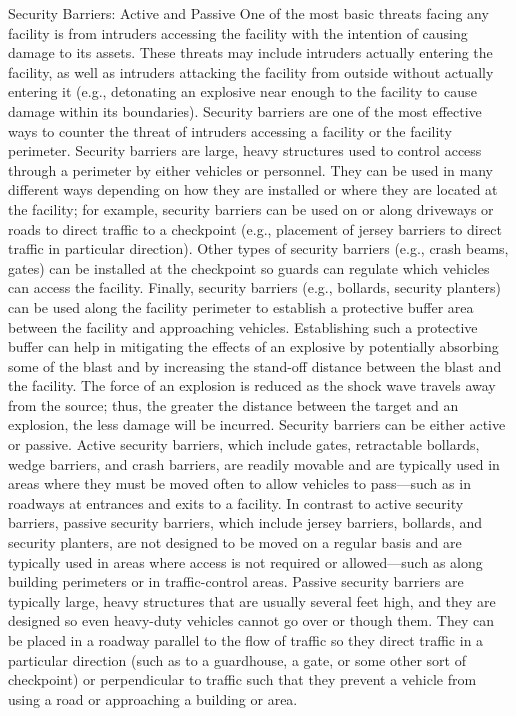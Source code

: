\documentclass{article}
\begin{document}
Security Barriers: Active and Passive One of the most basic threats
facing any facility is from intruders accessing the facility with the
intention of causing damage to its assets. These threats may include
intruders actually entering the facility, as well as intruders attacking
the facility from outside without actually entering it (e.g., detonating
an explosive near enough to the facility to cause damage within its
boundaries). Security barriers are one of the most effective ways to
counter the threat of intruders accessing a facility or the facility
perimeter. Security barriers are large, heavy structures used to control
access through a perimeter by either vehicles or personnel. They can be
used in many different ways depending on how they are installed or where
they are located at the facility; for example, security barriers can be
used on or along driveways or roads to direct traffic to a checkpoint
(e.g., placement of jersey barriers to direct traffic in particular
direction). Other types of security barriers (e.g., crash beams, gates)
can be installed at the checkpoint so guards can regulate which vehicles
can access the facility. Finally, security barriers (e.g., bollards,
security planters) can be used along the facility perimeter to establish
a protective buffer area between the facility and approaching vehicles.
Establishing such a protective buffer can help in mitigating the effects
of an explosive by potentially absorbing some of the blast and by
increasing the stand-off distance between the blast and the facility.
The force of an explosion is reduced as the shock wave travels away from
the source; thus, the greater the distance between the target and an
explosion, the less damage will be incurred. Security barriers can be
either active or passive. Active security barriers, which include gates,
retractable bollards, wedge barriers, and crash barriers, are readily
movable and are typically used in areas where they must be moved often
to allow vehicles to pass---such as in roadways at entrances and exits
to a facility. In contrast to active security barriers, passive security
barriers, which include jersey barriers, bollards, and security
planters, are not designed to be moved on a regular basis and are
typically used in areas where access is not required or allowed---such
as along building perimeters or in traffic-control areas. Passive
security barriers are typically large, heavy structures that are usually
several feet high, and they are designed so even heavy-duty vehicles
cannot go over or though them. They can be placed in a roadway parallel
to the flow of traffic so they direct traffic in a particular direction
(such as to a guardhouse, a gate, or some other sort of checkpoint) or
perpendicular to traffic such that they prevent a vehicle from using a
road or approaching a building or area.
\end{document}
